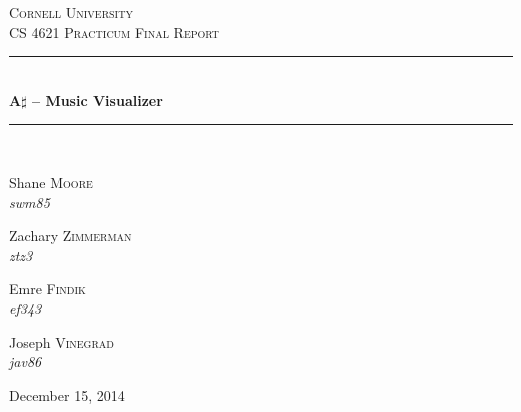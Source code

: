 \documentclass{article}
\newcommand{\HRule}{\rule{\linewidth}{0.5mm}}
\begin{document}
\begin{titlepage}
\begin{center}

\textsc{\LARGE Cornell University}\\[1.5cm]

\textsc{\Large CS 4621 Practicum Final Report}\\[0.5cm]

\HRule \\[0.4cm]
{ \huge \bfseries A$\sharp$ -- Music Visualizer \\[0.4cm] }

\HRule \\[1.5cm]

\begin{minipage}{0.4\textwidth}
\begin{flushleft} \large
Shane \textsc{Moore} \\
\emph{swm85}
\end{flushleft}
\end{minipage}
\begin{minipage}{0.4\textwidth}
\begin{flushright} \large
Zachary \textsc{Zimmerman} \\
\emph{ztz3}
\end{flushright}
\end{minipage}
\par\vspace{0.5cm}
\begin{minipage}{0.4\textwidth}
\begin{flushleft} \large
Emre \textsc{Findik} \\
\emph{ef343}
\end{flushleft}
\end{minipage}
\begin{minipage}{0.4\textwidth}
\begin{flushright} \large
Joseph \textsc{Vinegrad} \\
\emph{jav86}
\end{flushright}
\end{minipage}

\vfill

{\large December 15, 2014}

\end{center}

\end{titlepage}

\end{document}
